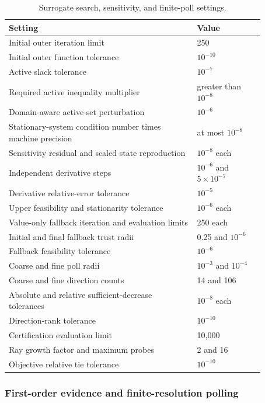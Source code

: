 \begin{table}[htbp]
\centering\small
\caption{Surrogate search, sensitivity, and finite-poll settings.}\label{tab:plant_surrogate_search_settings}
\begin{tabular}{p{0.64\linewidth}p{0.23\linewidth}}
\toprule Setting & Value\\\midrule
Initial outer iteration limit & 250\\
Initial outer function tolerance & $10^{-10}$\\
Active slack tolerance & $10^{-7}$\\
Required active inequality multiplier & greater than $10^{-8}$\\
Domain-aware active-set perturbation & $10^{-6}$\\
Stationary-system condition number times machine precision & at most $10^{-8}$\\
Sensitivity residual and scaled state reproduction & $10^{-8}$ each\\
Independent derivative steps & $10^{-6}$ and $5\times10^{-7}$\\
Derivative relative-error tolerance & $10^{-5}$\\
Upper feasibility and stationarity tolerance & $10^{-6}$ each\\
Value-only fallback iteration and evaluation limits & 250 each\\
Initial and final fallback trust radii & 0.25 and $10^{-6}$\\
Fallback feasibility tolerance & $10^{-6}$\\
Coarse and fine poll radii & $10^{-3}$ and $10^{-4}$\\
Coarse and fine direction counts & 14 and 106\\
Absolute and relative sufficient-decrease tolerances & $10^{-8}$ each\\
Direction-rank tolerance & $10^{-10}$\\
Certification evaluation limit & 10{,}000\\
Ray growth factor and maximum probes & 2 and 16\\
Objective relative tie tolerance & $10^{-10}$\\
\bottomrule
\end{tabular}
\end{table}

\subsubsection{First-order evidence and finite-resolution polling}

